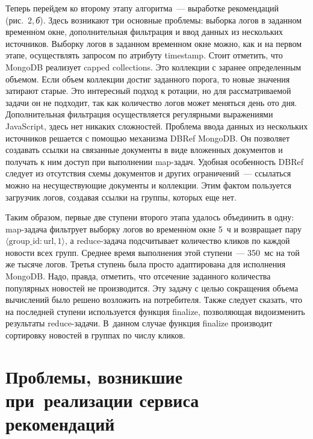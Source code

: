 \begin{multicols}{2}
   Теперь перейдем ко второму этапу алгоритма~--- выработке рекомендаций
   (рис.~2,\,\textit{б}). 
Здесь возникают три основные проблемы: выборка логов в заданном 
временн$\acute{\mbox{о}}$м окне, дополнительная фильтрация и ввод данных из нескольких 
источников. Выборку логов в заданном временном окне можно, как и на первом 
этапе, осуществлять запросом по атрибуту {\sf timestamp}. Стоит отметить, что 
MongoDB реализует capped collections. Это коллекции с заранее определенным 
объемом. Если объем коллекции достиг заданного порога, то новые значения 
затирают старые. Это интересный подход к ротации, но для рассматриваемой 
задачи он не подходит, так как количество логов может меняться
день ото дня. Дополнительная фильтрация осуществляется регулярными 
выражениями JavaScript, здесь нет никаких сложностей. Проблема ввода 
данных из нескольких источников решается с помощью механизма DBRef 
MongoDB. Он позволяет создавать ссылки на связанные документы в виде 
вложенных документов и получать к ним доступ при выполнении map-за\-дач. 
Удобная особенность DBRef следует из отсутствия схемы документов и других 
ограничений~--- ссылаться можно на несуществующие документы и коллекции. 
Этим фактом пользуется загрузчик логов, создавая ссылки на группы, которых 
еще нет. 

Таким образом, первые две ступени второго \mbox{этапа} удалось объединить 
в одну: map-за\-да\-ча фильтрует выборку логов во временн$\acute{\mbox{о}}$м окне 5~ч и 
возвращает пару $\langle\mathrm{group}\_\mathrm{id:url}, \mathrm{1}\rangle$, а 
reduce-за\-да\-ча подсчитывает количество кликов по каждой новости всех 
групп. Среднее время выполнения этой ступени~--- 350~мс на той же тысяче 
логов. Третья ступень была прос\-то адаптирована для исполнения MongoDB. 
Надо, правда, отметить, что отсечение заданного количества популярных 
новостей не производится. Эту задачу с целью сокращения объема вычислений 
было решено возложить на потребителя. Также следует сказать, что на 
последней ступени используется функция {\sf finalize}, позволяющая видоизменить 
результаты reduce-за\-да\-чи. В~данном случае функция {\sf finalize} производит 
сортировку новостей в группах по числу кликов.


\section{Проблемы, возникшие при~реализации сервиса 
рекомендаций}


\end{multicols}
